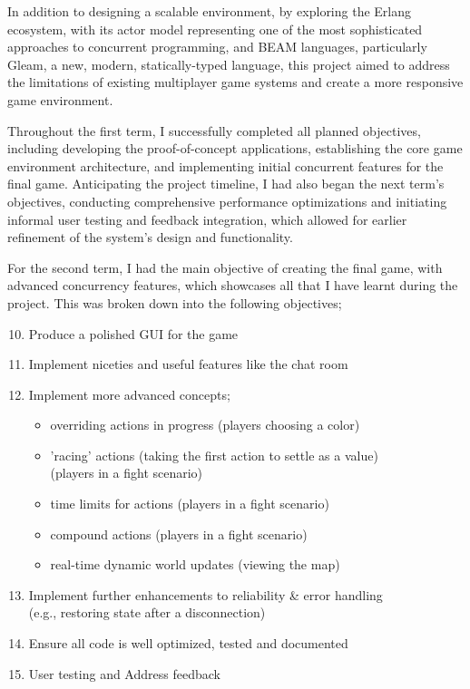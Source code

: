 \documentclass[]{final}
\begin{document}
In addition to designing a scalable environment,
by exploring the Erlang ecosystem, with its actor model representing one of the
most sophisticated approaches to concurrent programming, and
BEAM languages, particularly Gleam, a new, modern, statically-typed language,
this project aimed to address the limitations of existing multiplayer
game systems and create a more responsive game environment.

Throughout the first term, I successfully completed all planned objectives,
including developing the proof-of-concept applications,
establishing the core game environment architecture, and implementing initial
concurrent features for the final game. Anticipating the project timeline,
I had also began the next term's objectives, conducting comprehensive performance
optimizations and initiating informal user testing and feedback integration,
which allowed for earlier refinement of the system's design and functionality.

For the second term, I had the main objective of creating the final game, with
advanced concurrency features, which showcases all that I have learnt during the
project. This was broken down into the following objectives;

\begin{enumerate}
  \setcounter{enumi}{9}
  \item Produce a polished GUI for the game
  \item Implement niceties and useful features like the chat room
  \item Implement more advanced concepts;
        \begin{itemize}
          \item overriding actions in progress (players choosing a color)
          \item 'racing' actions (taking the first action to settle as a value)\\(players in a fight scenario)
          \item time limits for actions (players in a fight scenario)
          \item compound actions (players in a fight scenario)
          \item real-time dynamic world updates (viewing the map)
        \end{itemize}
  \item Implement further enhancements to reliability \& error handling\\(e.g., restoring state after a disconnection)
  \item Ensure all code is well optimized, tested and documented
  \item User testing and Address feedback
\end{enumerate}
\end{document}
